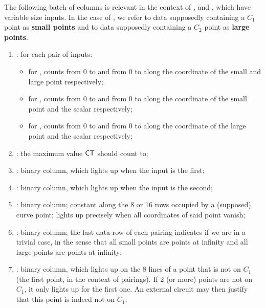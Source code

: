 The following batch of columns is relevant in the context of ,  and , which have variable size inputs.
In the case of , we refer to data supposedly containing a $C_1$ point as \textbf{small points} and to data supposedly containing a $C_2$ point as \textbf{large points}.
\begin{enumerate}[resume]
      \item \ct:
            for each pair of inputs:
            \begin{itemize}
                  \item for , counts from 0 to \ctMaxSmallPoint{} and from 0 to \ctMaxLargePoint{} along the coordinate of the small and large point respectively;
                  \item for , counts from 0 to \ctMaxSmallPoint{} and from 0 to \ctMaxScalar{} along the coordinate of the small point and the scalar respectively;
                  \item for , counts from 0 to \ctMaxLargePoint{} and from 0 to \ctMaxScalar{} along the coordinate of the large point and the scalar respectively;
            \end{itemize}
      \item \maxCt:
            the maximum value $\textsf{CT}$ should count to;
      \item \isFirstInput:
            binary column, which lights up when the input is the first;
      \item \isSecondInput:
            binary column, which lights up when the input is the second;
      \item \isInfinity:
            binary column;
            constant along the 8 or 16 rows occupied by a (supposed) curve point;
            lights up precisely when all coordinates of said point vanish;
      \item \both{\trivialPairing}: binary column; the last data row of each pairing indicates if we are in a trivial case, in the sense that all small points are points at infinity and all large points are points at infinity;
      \item \notOnCOne{} \blsPrediction{}: binary column, which lights up on the 8 lines of a point that is not on $C_1$ (the first point, in the context of pairings). If 2 (or more) points are not on $C_1$, it only lights up for the first one. An external circuit may then justify that this point is indeed not on $C_1$;       

\end{enumerate}
